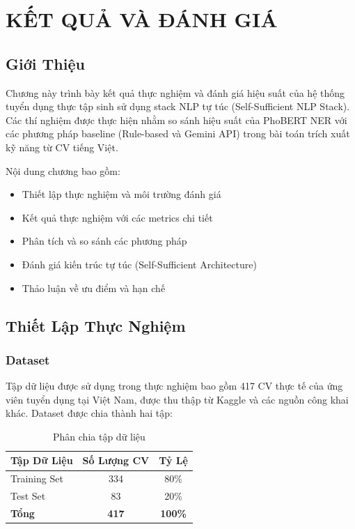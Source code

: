 \chapter{KẾT QUẢ VÀ ĐÁNH GIÁ}
\label{chap:results}

\section{Giới Thiệu}

Chương này trình bày kết quả thực nghiệm và đánh giá hiệu suất của hệ thống tuyển dụng thực tập sinh sử dụng stack NLP tự túc (Self-Sufficient NLP Stack). Các thí nghiệm được thực hiện nhằm so sánh hiệu suất của PhoBERT NER với các phương pháp baseline (Rule-based và Gemini API) trong bài toán trích xuất kỹ năng từ CV tiếng Việt.

Nội dung chương bao gồm:
\begin{itemize}
    \item Thiết lập thực nghiệm và môi trường đánh giá
    \item Kết quả thực nghiệm với các metrics chi tiết
    \item Phân tích và so sánh các phương pháp
    \item Đánh giá kiến trúc tự túc (Self-Sufficient Architecture)
    \item Thảo luận về ưu điểm và hạn chế
\end{itemize}

\section{Thiết Lập Thực Nghiệm}
\label{sec:evaluation_setup}

\subsection{Dataset}

Tập dữ liệu được sử dụng trong thực nghiệm bao gồm 417 CV thực tế của ứng viên tuyển dụng tại Việt Nam, được thu thập từ Kaggle và các nguồn công khai khác. Dataset được chia thành hai tập:

\begin{table}[h]
\centering
\caption{Phân chia tập dữ liệu}
\label{tab:dataset_split}
\begin{tabular}{lcc}
\hline
\textbf{Tập Dữ Liệu} & \textbf{Số Lượng CV} & \textbf{Tỷ Lệ} \\
\hline
Training Set & 334 & 80\% \\
Test Set & 83 & 20\% \\
\hline
\textbf{Tổng} & \textbf{417} & \textbf{100\%} \\
\hline
\end{tabular}
\end{table}

